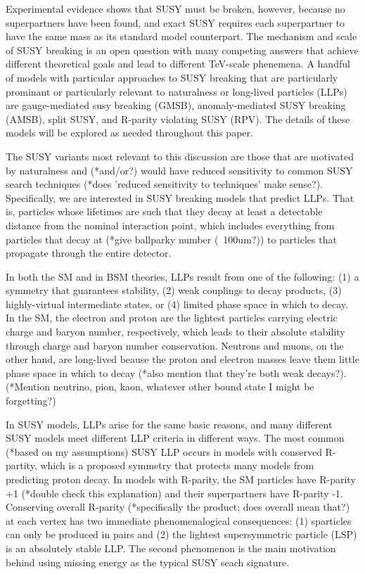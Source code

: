 \documentclass[12pt]{article}
\begin{document}
    Experimental evidence shows that SUSY must be broken, however, because no superpartners have been found, and exact SUSY requires each superpartner to have the same mass as its standard model counterpart. The mechanism and scale of SUSY breaking is an open question with many competing answers that achieve different theoretical goals and lead to different TeV-scale phenemena. A handful of models with particular approaches to SUSY breaking that are particularly prominant or particularly relevant to naturalness or long-lived particles (LLPs) are gauge-mediated susy breaking (GMSB), anomaly-mediated SUSY breaking (AMSB), split SUSY, and R-parity violating SUSY (RPV). The details of these models will be explored as needed throughout this paper.

    The SUSY variants most relevant to this discussion are those that are motivated by naturalness and (*and/or?) would have reduced sensitivity to common SUSY search techniques (*does 'reduced sensitivity to techniques' make sense?). Specifically, we are interested in SUSY breaking models that predict LLPs. That is, particles whose lifetimes are such that they decay at least a detectable distance from the nominal interaction point, which includes everything from particles that decay at (*give ballparky number (~100um?)) to particles that propagate through the entire detector. 

    In both the SM and in BSM theories, LLPs result from one of the following: (1) a symmetry that guarantees stability, (2) weak couplings to decay products, (3) highly-virtual intermediate states, or (4) limited phase space in which to decay. In the SM, the electron and proton are the lightest particles carrying electric charge and baryon number, respectively, which leads to their absolute stability through charge and baryon number conservation. Neutrons and muons, on the other hand, are long-lived beause the proton and electron masses leave them little phase space in which to decay (*also mention that they're both weak decays?). (*Mention neutrino, pion, kaon, whatever other bound state I might be forgetting?)

    In SUSY models, LLPs arise for the same basic reasons, and many different SUSY models meet different LLP criteria in different ways. The most common (*based on my assumptions) SUSY LLP occurs in models with conserved R-partity, which is a proposed symmetry that protects many models from predicting proton decay. In models with R-parity, the SM particles have R-parity +1 (*double check this explanation) and their superpartners have R-parity -1. Conserving overall R-parity (*specifically the product; does overall mean that?) at each vertex has two immediate phenomenalogical consequences: (1) sparticles can only be produced in pairs and (2) the lightest supersymmetric particle (LSP) is an absolutely stable LLP. The second phenomenon is the main motivation behind using missing energy as the typical SUSY seach signature.
\end{document}
